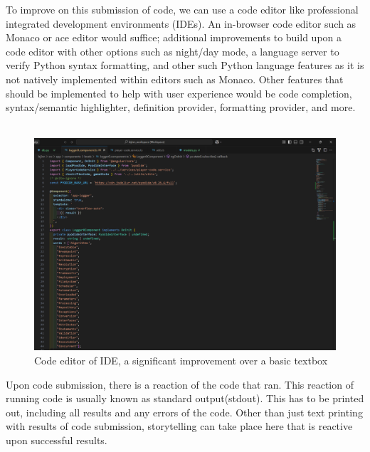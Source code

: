 To improve on this submission of code, we can use a code editor like professional integrated development environments (IDEs). An in-browser code editor such as Monaco or ace editor would suffice; additional improvements to build upon a code editor with other options such as night/day mode, a language server to verify Python syntax formatting, and other such Python language features as it is not natively implemented within editors such as Monaco. Other features that should be implemented to help with user experience would be code completion, syntax/semantic highlighter, definition provider, formatting provider, and more.
\\\\
\begin{figure}[H]
    \centering
    \includegraphics[width=0.3\linewidth]{images/code_editor.png}
    \caption{Code editor of IDE, a significant improvement over a basic textbox}
\end{figure}
Upon code submission, there is a reaction of the code that ran. This reaction of running code is usually known as standard output(stdout). This has to be printed out, including all results and any errors of the code. Other than just text printing with results of code submission, storytelling can take place here that is reactive upon successful results. 
